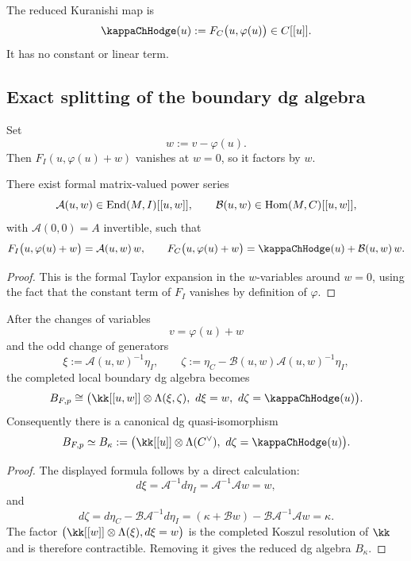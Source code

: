 \begin{definition}
The reduced Kuranishi map is
\begin{equation}%
\kappaChHodge(u):=F_C\bigl(u,\varphi(u)\bigr)\in C[[u]].
\end{equation}
It has no constant or linear term.
\end{definition}

\subsection{Exact splitting of the boundary dg algebra}

Set
\[
w:=v-\varphi(u).
\]
Then $F_I(u,\varphi(u)+w)$ vanishes at $w=0$, so it factors by $w$.

\begin{lemma}%
There exist formal matrix-valued power series
\[
\mathcal A(u,w)\in \operatorname{End}(M,I)[[u,w]],
\qquad
\mathcal B(u,w)\in \operatorname{Hom}(M,C)[[u,w]],
\]
with $\mathcal A(0,0)=A$ invertible, such that
\[
F_I\bigl(u,\varphi(u)+w\bigr)=\mathcal A(u,w)\,w,
\qquad
F_C\bigl(u,\varphi(u)+w\bigr)=\kappaChHodge(u)+\mathcal B(u,w)\,w.
\]
\end{lemma}

\begin{proof}
This is the formal Taylor expansion in the $w$-variables around $w=0$, using the fact that the constant term of $F_I$ vanishes by definition of $\varphi$.
\end{proof}

\begin{theorem}%
After the changes of variables
\[
v=\varphi(u)+w
\]
and the odd change of generators
\[
\xi:=\mathcal A(u,w)^{-1}\eta_I,
\qquad
\zeta:=\eta_C-\mathcal B(u,w)\mathcal A(u,w)^{-1}\eta_I,
\]
the completed local boundary dg algebra becomes
\[
B_{F,p}
\cong
\bigl(\kk[[u,w]]\ot \Lambda(\xi,\zeta),\ d\xi=w,\ d\zeta=\kappaChHodge(u)\bigr).
\]
Consequently there is a canonical dg quasi-isomorphism
\[
B_{F,p}\simeq B_\kappa
:=
\bigl(\kk[[u]]\ot \Lambda(C^\vee),\ d\zeta=\kappaChHodge(u)\bigr).
\]
\end{theorem}

\begin{proof}
The displayed formula follows by a direct calculation:
\[
d\xi=\mathcal A^{-1}d\eta_I=\mathcal A^{-1}\mathcal A w=w,
\]
and
\[
d\zeta=d\eta_C-\mathcal B\mathcal A^{-1}d\eta_I
=(\kappa+\mathcal Bw)-\mathcal B\mathcal A^{-1}\mathcal A w
=\kappa.
\]
The factor $\bigl(\kk[[w]]\ot \Lambda(\xi),d\xi=w\bigr)$ is the completed Koszul resolution of $\kk$ and is therefore contractible. Removing it gives the reduced dg algebra $B_\kappa$.
\end{proof}

